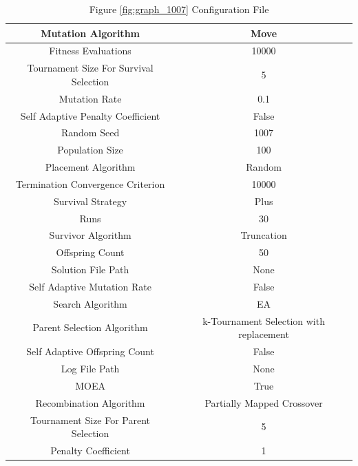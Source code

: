 \documentclass{standalone}
\begin{document}
\begin{table}[!htb]
	\centering
	\caption{Figure \ref{fig:graph_1007} Configuration File}
	\label{tab:graph_1007}
	\begin{tabular}{| c | c |}
		\hline
		Mutation Algorithm		& Move		 \\
		\hline
		Fitness Evaluations		& 10000		 \\
		\hline
		Tournament Size For Survival Selection		& 5		 \\
		\hline
		Mutation Rate		& 0.1		 \\
		\hline
		Self Adaptive Penalty Coefficient		& False		 \\
		\hline
		Random Seed		& 1007		 \\
		\hline
		Population Size		& 100		 \\
		\hline
		Placement Algorithm		& Random		 \\
		\hline
		Termination Convergence Criterion		& 10000		 \\
		\hline
		Survival Strategy		& Plus		 \\
		\hline
		Runs		& 30		 \\
		\hline
		Survivor Algorithm		& Truncation		 \\
		\hline
		Offspring Count		& 50		 \\
		\hline
		Solution File Path		& None		 \\
		\hline
		Self Adaptive Mutation Rate		& False		 \\
		\hline
		Search Algorithm		& EA		 \\
		\hline
		Parent Selection Algorithm		& k-Tournament Selection with replacement		 \\
		\hline
		Self Adaptive Offspring Count		& False		 \\
		\hline
		Log File Path		& None		 \\
		\hline
		MOEA		& True		 \\
		\hline
		Recombination Algorithm		& Partially Mapped Crossover		 \\
		\hline
		Tournament Size For Parent Selection		& 5		 \\
		\hline
		Penalty Coefficient		& 1		 \\
		\hline
	\end{tabular}
\end{table}
\end{document}
